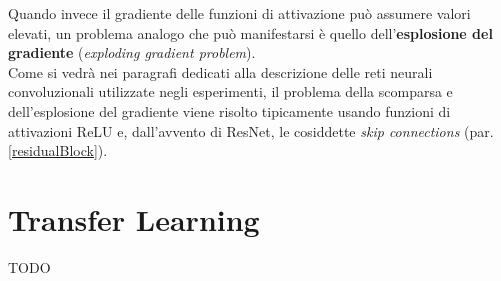 Quando invece il gradiente delle funzioni di attivazione può assumere valori elevati, un problema analogo che può manifestarsi è quello dell'\textbf{esplosione del gradiente} (\textit{exploding gradient problem}).\\

Come si vedrà nei paragrafi dedicati alla descrizione delle reti neurali convoluzionali utilizzate negli esperimenti, il problema della scomparsa e dell'esplosione del gradiente viene risolto tipicamente usando funzioni di attivazioni ReLU e, dall'avvento di ResNet, le cosiddette \textit{skip connections} (par. \ref{residualBlock}).

\section{Transfer Learning}
TODO